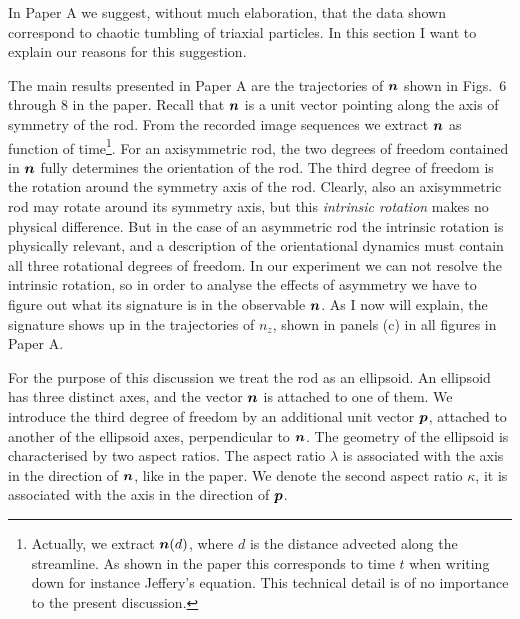 \documentclass[thesis.tex]{subfiles}
\begin{document}
In Paper A we suggest, without much elaboration, that the data shown correspond to chaotic tumbling of triaxial particles. In this section I want to explain our reasons for this suggestion.

The main results presented in Paper A are the trajectories of $\mbox{\boldmath$n$}$ shown in Figs.~6 through 8 in the paper. Recall that $\mbox{\boldmath$n$}$ is a unit vector pointing along the axis of symmetry of the rod. From the recorded image sequences we extract $\mbox{\boldmath$n$}$ as function of time\footnote{Actually, we extract $\mbox{\boldmath$n$}(d)$, where $d$ is the distance advected along the streamline. As shown in the paper this corresponds to time $t$ when writing down for instance Jeffery's equation. This technical detail is of no importance to the present discussion.}. For an axisymmetric rod, the two degrees of freedom contained in $\mbox{\boldmath$n$}$ fully determines the orientation of the rod. The third degree of freedom is the rotation around the symmetry axis of the rod. Clearly, also an axisymmetric rod may rotate around its symmetry axis, but this \emph{intrinsic rotation} makes no physical difference. But in the case of an asymmetric rod the intrinsic rotation is physically relevant, and a description of the orientational dynamics must contain all three rotational degrees of freedom. In our experiment we can not resolve the intrinsic rotation, so in order to analyse the effects of asymmetry we have to figure out what its signature is in the observable $\mbox{\boldmath$n$}$. As I now will explain, the signature shows up in the trajectories of $n_z$, shown in panels (c) in all figures in Paper A. 

For the purpose of this discussion we treat the rod as an ellipsoid. An ellipsoid has three distinct axes, and the vector $\mbox{\boldmath$n$}$ is attached to one of them. We introduce the third degree of freedom by an additional unit vector $\mbox{\boldmath$p$}$, attached to another of the ellipsoid axes, perpendicular to $\mbox{\boldmath$n$}$. The geometry of the ellipsoid is characterised by two aspect ratios. The aspect ratio $\lambda$ is associated with the axis in the direction of $\mbox{\boldmath$n$}$, like in the paper. We denote the second aspect ratio $\kappa$, it is associated with the axis in the direction of $\mbox{\boldmath$p$}$. 
\end{document}
